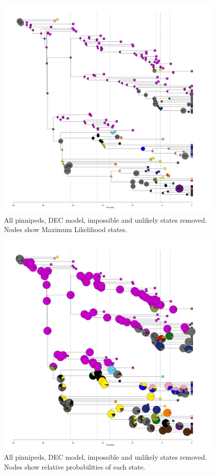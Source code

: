 \documentclass[a4paper, 12pt]{article}
\begin{document}
\begin{figure}[H]
 \centering
  \includegraphics[width = \linewidth]{figures/all-pinnipeds-DEC-unlikely-MLstates.png}
  \caption{All pinnipeds, DEC model, impossible and unlikely states removed. Nodes show Maximum Likelihood states.}
  \label{fig-all-dec-ml-unlikely}
\end{figure} 

\begin{figure}[H]
 \centering
  \includegraphics[width = \linewidth]{figures/all-pinnipeds-DEC-unlikely-pies.png}
  \caption{All pinnipeds, DEC model, impossible and unlikely states removed. Nodes show relative probabilities of each state.}
  \label{fig-all-dec-pie-unlikely}
\end{figure} 
\end{document}
